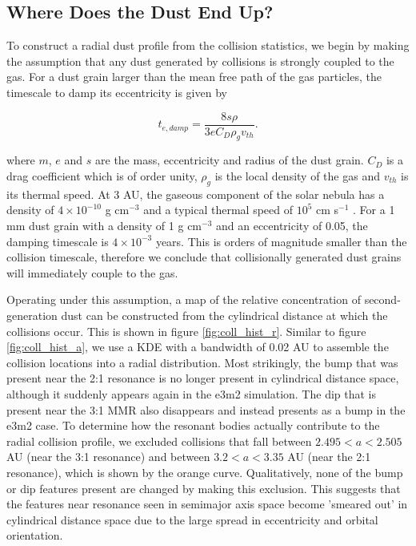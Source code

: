 \documentclass[twocolumn]{aastex63}
\begin{document}
\subsection{Where Does the Dust End Up?}

To construct a radial dust profile from the collision statistics, we begin by making the assumption that any dust generated by collisions is strongly 
coupled to the gas. For a dust grain larger than the mean free path of the gas particles, the timescale to damp its eccentricity is given by 
\citep{1976PThPh..56.1756A}

\begin{equation}\label{eq:t_edamp}
    t_{e, damp} = \frac{8 s \rho}{3 e C_{D} \rho_{g} v_{th}}.
\end{equation}

\noindent where $m$, $e$ and $s$ are the mass, eccentricity and radius of the dust grain. $C_{D}$ is a drag coefficient which is of order unity, $
\rho_{g}$ is the local density of the gas and $v_{th}$ is its thermal speed. At 3 AU, the gaseous component of the solar nebula has a density of $4 
\times 10^{-10}$ g cm$^{-3}$ and a typical thermal speed of $10^{5}$ cm s$^{-1}$ \citep{1981PThPS..70...35H}. For a 1 mm dust grain with a 
density of 1 g cm$^{-3}$ and an eccentricity of 0.05, the damping timescale is $4 \times 10^{-3}$ years. This is orders of magnitude smaller than the 
collision timescale, therefore we conclude that collisionally generated dust grains will immediately couple to the gas.

Operating under this assumption, a map of the relative concentration of second-generation dust can be constructed from the cylindrical 
distance at which the collisions occur. This is shown in figure \ref{fig:coll_hist_r}. Similar to figure \ref{fig:coll_hist_a}, we use a KDE with a bandwidth 
of 0.02 AU to assemble the collision locations into a radial distribution. Most strikingly, the bump that was present near the 2:1 resonance is no 
longer present in cylindrical distance space, although it suddenly appears again in the e3m2 simulation. The dip that is present near the 3:1 MMR 
also disappears and instead presents as a bump in the e3m2 case. To determine how the resonant bodies actually contribute to the radial collision 
profile, we excluded collisions that fall between $2.495 < a < 2.505$ AU (near the 3:1 resonance) and between $3.2 < a < 3.35$ AU (near the 2:1 
resonance), which is shown by the orange curve. Qualitatively, none of the bump or dip features present are changed by making this exclusion. This 
suggests that the features near resonance seen in semimajor axis space become 'smeared out' in cylindrical distance space due to the large spread 
in eccentricity and orbital orientation.
\end{document}

